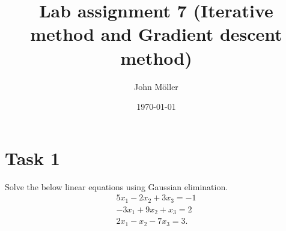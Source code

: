 \documentclass[10pt]{article}
\author{John Möller}
\date{\today}
\title{Lab assignment 7 (Iterative method and Gradient descent method)}
\begin{document}
\maketitle

\section{Task 1}
\label{sec:org2810779}
\begin{exercise}[Task1]  \label{exe:Task1}
Solve the below linear equations using Gaussian elimination.
\begin{align*}
5x_1 - 2x_2 + 3x_3 = -1 \\
-3x_1 + 9x_2 + x_3 = 2 \\
2x_1 - x_2 - 7x_3 = 3
.
\end{align*}

\end{exercise}
\end{document}

